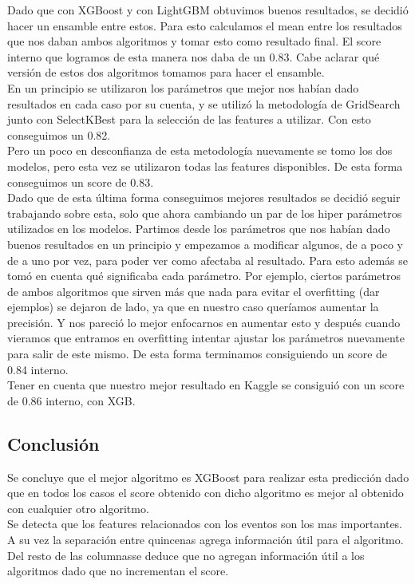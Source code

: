 \documentclass[a4paper]{article}
\begin{document}
            Dado que con XGBoost y con LightGBM obtuvimos buenos resultados, se decidió hacer un ensamble entre estos. Para esto calculamos el mean entre los resultados que nos daban ambos algoritmos y tomar esto como resultado final. El score interno que logramos de esta manera nos daba de un 0.83.
            Cabe aclarar qué versión de estos dos algoritmos tomamos para hacer el ensamble.\\
            En un principio se utilizaron los parámetros que mejor nos habían dado resultados en cada caso por su cuenta, y se utilizó la metodología de GridSearch junto con SelectKBest para la selección de las features a utilizar. Con esto conseguimos un 0.82.\\
            Pero un poco en desconfianza de esta metodología nuevamente se tomo los dos modelos, pero esta vez se utilizaron todas las features disponibles. De esta forma conseguimos un score de 0.83.\\
            Dado que de esta última forma conseguimos mejores resultados se decidió seguir trabajando sobre esta, solo que ahora cambiando un par de los hiper parámetros utilizados en los modelos. Partimos desde los parámetros que nos habían dado buenos resultados en un principio y empezamos a modificar algunos, de a poco y de a uno por vez, para poder ver como afectaba al resultado. Para esto además se tomó en cuenta qué significaba cada parámetro. Por ejemplo, ciertos parámetros de ambos algoritmos que sirven más que nada para evitar el overfitting (dar ejemplos) se dejaron de lado, ya que en nuestro caso queríamos aumentar la precisión. Y nos pareció lo mejor enfocarnos en aumentar esto y después cuando vieramos que entramos en overfitting intentar ajustar los parámetros nuevamente para salir de este mismo. De esta forma terminamos consiguiendo un score de 0.84 interno.\\
            Tener en cuenta que nuestro mejor resultado en Kaggle se consiguió con un score de 0.86 interno, con XGB.\\
            
            
    \subsection{Conclusión}\label{subset:conclusion}
        Se concluye que el mejor algoritmo es XGBoost para realizar esta predicción dado que en todos los casos el score obtenido con dicho algoritmo es mejor al obtenido con cualquier otro algoritmo.\\
        Se detecta que los features relacionados con los eventos son los mas importantes. A su vez la separación entre quincenas agrega información útil para el algoritmo. Del resto de las columnasse deduce que no agregan información útil a los algoritmos dado que no incrementan el score. 
\end{document}
